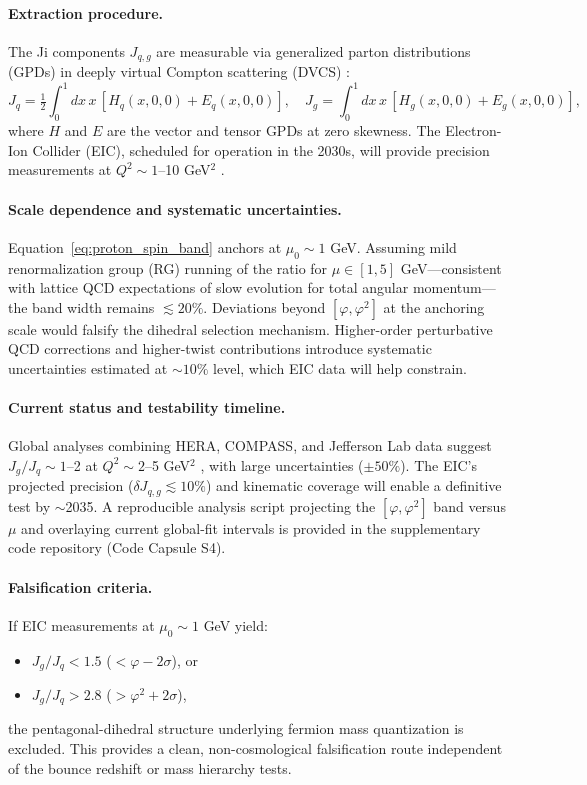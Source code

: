 \documentclass[12pt]{article}
\begin{document}
\paragraph{Extraction procedure.} The Ji components $J_{q,g}$ are measurable via generalized parton distributions (GPDs) in deeply virtual Compton scattering (DVCS) \cite{eic2022science}:
\begin{equation}
J_q=\tfrac{1}{2}\int_0^1\!dx\, x\,[H_q(x,0,0)+E_q(x,0,0)],\quad
J_g=\int_0^1\!dx\, x\,[H_g(x,0,0)+E_g(x,0,0)],
\end{equation}
where $H$ and $E$ are the vector and tensor GPDs at zero skewness. The Electron-Ion Collider (EIC), scheduled for operation in the 2030s, will provide precision measurements at $Q^2 \sim 1$--10 GeV$^2$ \cite{ethier2023eic}.

\paragraph{Scale dependence and systematic uncertainties.} Equation~\eqref{eq:proton_spin_band} anchors at $\mu_0 \sim 1$ GeV. Assuming mild renormalization group (RG) running of the ratio for $\mu \in [1, 5]$ GeV—consistent with lattice QCD expectations of slow evolution for total angular momentum—the band width remains $\lesssim 20\%$. Deviations beyond $[\varphi, \varphi^2]$ at the anchoring scale would falsify the dihedral selection mechanism. Higher-order perturbative QCD corrections and higher-twist contributions introduce systematic uncertainties estimated at $\sim 10\%$ level, which EIC data will help constrain.

\paragraph{Current status and testability timeline.} Global analyses combining HERA, COMPASS, and Jefferson Lab data suggest $J_g/J_q \sim 1$--2 at $Q^2 \sim 2$--5 GeV$^2$ \cite{star2021gluon}, with large uncertainties ($\pm 50\%$). The EIC's projected precision ($\delta J_{q,g} \lesssim 10\%$) and kinematic coverage will enable a definitive test by $\sim$2035. A reproducible analysis script projecting the $[\varphi, \varphi^2]$ band versus $\mu$ and overlaying current global-fit intervals is provided in the supplementary code repository (Code Capsule S4).

\paragraph{Falsification criteria.} If EIC measurements at $\mu_0 \sim 1$ GeV yield:
\begin{itemize}
\item $J_g/J_q < 1.5$ ($< \varphi - 2\sigma$), or
\item $J_g/J_q > 2.8$ ($> \varphi^2 + 2\sigma$),
\end{itemize}
the pentagonal-dihedral structure underlying fermion mass quantization is excluded. This provides a clean, non-cosmological falsification route independent of the bounce redshift or mass hierarchy tests.
\end{document}
